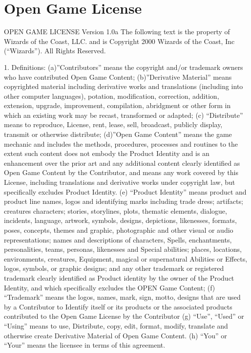 \documentclass[letter,10pt,twocolumn,openany]{dndbook}
\begin{document}


\section{Open Game License}

OPEN GAME LICENSE Version 1.0a The following text is the property of Wizards of the Coast, LLC. and is Copyright 2000 Wizards of the Coast, Inc (“Wizards”). All Rights Reserved.

1. Definitions: (a)”Contributors” means the copyright and/or trademark owners who have contributed Open Game Content; (b)”Derivative Material” means copyrighted material including derivative works and translations (including into other computer languages), potation, modification, correction, addition, extension, upgrade, improvement, compilation, abridgment or other form in which an existing work may be recast, transformed or adapted; (c) “Distribute” means to reproduce, License, rent, lease, sell, broadcast, publicly display, transmit or otherwise distribute; (d)”Open Game Content” means the game mechanic and includes the methods, procedures, processes and routines to the extent such content does not embody the Product Identity and is an enhancement over the prior art and any additional content clearly identified as Open Game Content by the Contributor, and means any work covered by this License, including translations and derivative works under copyright law, but specifically excludes Product Identity. (e) “Product Identity” means product and product line names, logos and identifying marks including trade dress; artifacts; creatures characters; stories, storylines, plots, thematic elements, dialogue, incidents, language, artwork, symbols, designs, depictions, likenesses, formats, poses, concepts, themes and graphic, photographic and other visual or audio representations; names and descriptions of characters, Spells, enchantments, personalities, teams, personas, likenesses and Special abilities; places, locations, environments, creatures, Equipment, magical or supernatural Abilities or Effects, logos, symbols, or graphic designs; and any other trademark or registered trademark clearly identified as Product identity by the owner of the Product Identity, and which specifically excludes the OPEN Game Content; (f) “Trademark” means the logos, names, mark, sign, motto, designs that are used by a Contributor to Identify itself or its products or the associated products contributed to the Open Game License by the Contributor (g) “Use”, “Used” or “Using” means to use, Distribute, copy, edit, format, modify, translate and otherwise create Derivative Material of Open Game Content. (h) “You” or “Your” means the licensee in terms of this agreement.
\end{document}
